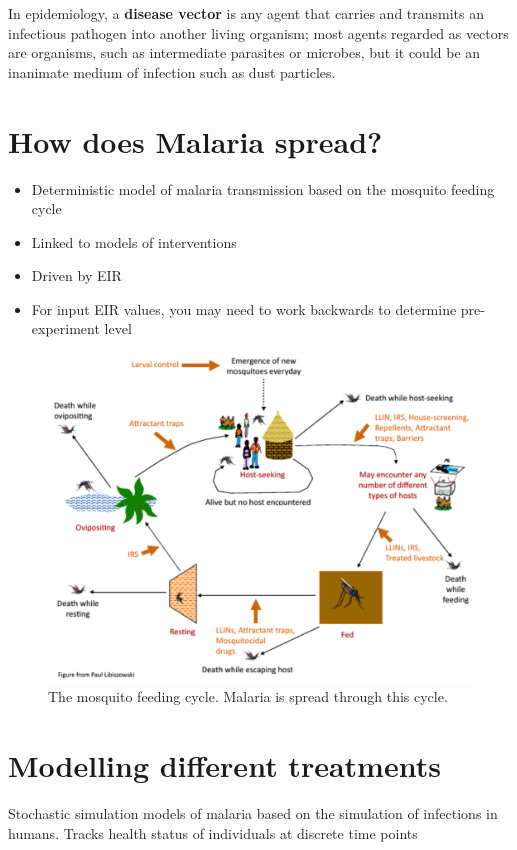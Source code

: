 \documentclass[]{scrartcl}
\begin{document}
In epidemiology, a \textbf{disease vector} is any agent that carries and transmits an infectious pathogen into another living organism; most agents regarded as vectors are organisms, such as intermediate parasites or microbes, but it could be an inanimate medium of infection such as dust particles.

\section{How does Malaria spread?}
\begin{itemize}
\item Deterministic model of malaria transmission based on the mosquito feeding cycle
\item Linked to models of interventions
\item Driven by EIR
\item For input EIR values, you may need to work backwards to determine pre-experiment level
\end{itemize}


\begin{figure}
\includegraphics[width=\textwidth]{images/malariacycle.png}
\caption{The mosquito feeding cycle. Malaria is spread through this cycle.}
\end{figure}

\section{Modelling different treatments}

Stochastic simulation models of malaria based on the simulation of infections in humans. Tracks health status of individuals at discrete time points
\end{document}
